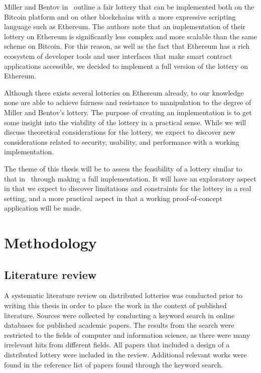 Miller and Bentov in~\cite{miller_zero-collateral_2017} outline a fair lottery that can be implemented both on the Bitcoin platform and on other blockchains with a more expressive scripting language such as Ethereum. The authors note that an implementation of their lottery on Ethereum is significantly less complex and more scalable than the same scheme on Bitcoin. For this reason, as well as the fact that Ethereum has a rich ecosystem of developer tools and user interfaces that make smart contract applications accessible, we decided to implement a full version of the lottery on Ethereum. 

Although there exists several lotteries on Ethereum already, to our knowledge none are able to achieve fairness and resistance to manipulation to the degree of Miller and Bentov's lottery. The purpose of creating an implementation is to get some insight into the viability of the lottery in a practical sense. While we will discuss theoretical considerations for the lottery, we expect to discover new considerations related to security, usability, and performance with a working implementation.

The theme of this thesis will be to assess the feasibility of a lottery similar to that in~\cite{miller_zero-collateral_2017} through making a full implementation. It will have an exploratory aspect in that we expect to discover limitations and constraints for the lottery in a real setting, and a more practical aspect in that a working proof-of-concept application will be made.

\section{Methodology}
\label{sec:methodology}

\subsection{Literature review}

A systematic literature review on distributed lotteries was conducted prior to writing this thesis in order to place the work in the context of published literature. Sources were collected by conducting a keyword search in online databases for published academic papers. The results from the search were restricted to the fields of computer and information science, as there were many irrelevant hits from different fields. All papers that included a design of a distributed lottery were included in the review. Additional relevant works were found in the reference list of papers found through the keyword search. 

